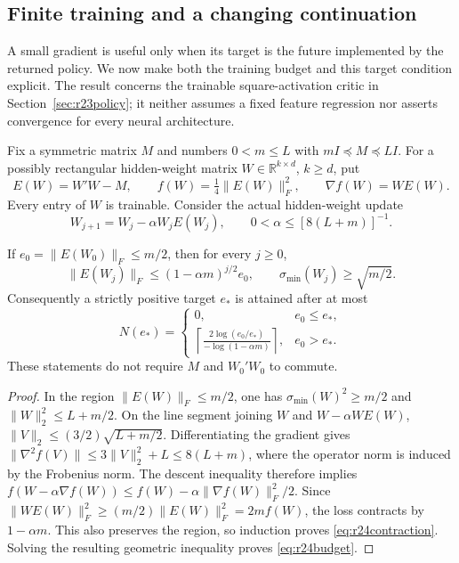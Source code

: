 \subsection{Finite training and a changing continuation}\label{sec:r24learning}
A small gradient is useful only when its target is the future implemented by
the returned policy. We now make both the training budget and this target
condition explicit. The result concerns the trainable square-activation
critic in Section~\ref{sec:r23policy}; it neither assumes a fixed feature
regression nor asserts convergence for every neural architecture.

Fix a symmetric matrix $M$ and numbers $0<m\leq L$ with
$mI\preceq M\preceq LI$. For a possibly rectangular hidden-weight matrix
$W\in\mathbb R^{k\times d}$, $k\geq d$, put
\[
 E(W)=W'W-M,\qquad f(W)=\tfrac14\|E(W)\|_F^2,
 \qquad \nabla f(W)=WE(W).
\]
Every entry of $W$ is trainable. Consider the actual hidden-weight update
\begin{equation}
 W_{j+1}=W_j-\alpha W_jE(W_j),\qquad
 0<\alpha\leq[8(L+m)]^{-1}.
 \label{eq:r24update}
\end{equation}

\begin{proposition}\label{prop:r24learning}
If $e_0=\|E(W_0)\|_F\leq m/2$, then for every $j\geq0$,
\begin{equation}
 \|E(W_j)\|_F\leq (1-\alpha m)^{j/2}e_0,
 \qquad \sigma_{\min}(W_j)\geq\sqrt{m/2}.
 \label{eq:r24contraction}
\end{equation}
Consequently a strictly positive target $e_*$ is attained after at most
\begin{equation}
 N(e_*)=\begin{cases}
 0,&e_0\leq e_*,\\
 \left\lceil\displaystyle\frac{2\log(e_0/e_*)}
 {-\log(1-\alpha m)}\right\rceil,&e_0>e_*.
 \end{cases}
 \label{eq:r24budget}
\end{equation}
These statements do not require $M$ and $W_0'W_0$ to commute.
\end{proposition}

\begin{proof}
In the region $\|E(W)\|_F\leq m/2$, one has
$\sigma_{\min}(W)^2\geq m/2$ and $\|W\|_2^2\leq L+m/2$.
On the line segment joining $W$ and $W-\alpha WE(W)$,
$\|V\|_2\leq(3/2)\sqrt{L+m/2}$. Differentiating the gradient gives
$\|\nabla^2 f(V)\|\leq3\|V\|_2^2+L\leq8(L+m)$, where the operator
norm is induced by the Frobenius norm. The descent inequality therefore
implies $f(W-\alpha\nabla f(W))\leq f(W)-\alpha\|\nabla f(W)\|_F^2/2$.
Since $\|WE(W)\|_F^2\geq(m/2)\|E(W)\|_F^2=2mf(W)$, the loss contracts
by $1-\alpha m$. This also preserves the region, so induction proves
\eqref{eq:r24contraction}. Solving the resulting geometric inequality
proves \eqref{eq:r24budget}.
\end{proof}


